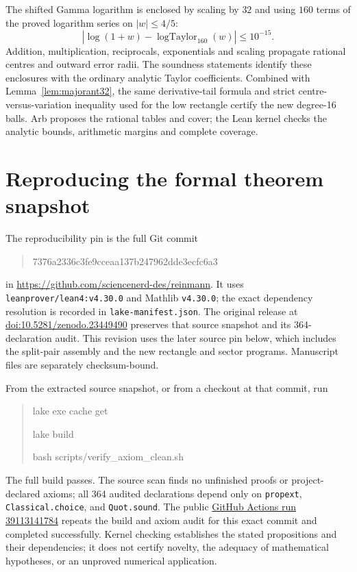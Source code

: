 \documentclass[11pt]{amsart}
\begin{document}
The shifted Gamma logarithm is enclosed by scaling by $32$ and using
$160$ terms of the proved logarithm series on $|w|\le4/5$:
\[
 |\log(1+w)-\operatorname{logTaylor}_{160}(w)|\le10^{-15}.
\]
Addition, multiplication, reciprocals, exponentials and scaling propagate
rational centres and outward error radii. The soundness statements identify
these enclosures with the ordinary analytic Taylor coefficients. Combined
with Lemma~\ref{lem:majorant32}, the same derivative-tail formula and strict
centre-versus-variation inequality used for the low rectangle certify the
new degree-16 balls. Arb proposes the rational tables and cover; the Lean
kernel checks the analytic bounds, arithmetic margins and complete coverage.

\appendix
\section{Reproducing the formal theorem snapshot}\label{app:repro}
The reproducibility pin is the full Git commit
\begin{quote}\small\ttfamily
7376a2336c3fe9cceaa137b247962dde3ecfc6a3
\end{quote}
in \url{https://github.com/sciencenerd-des/reinmann}. It uses
\texttt{leanprover/lean4:v4.30.0} and Mathlib \texttt{v4.30.0}; the exact dependency
resolution is recorded in \texttt{lake-manifest.json}. The original release at
\href{https://doi.org/10.5281/zenodo.23449490}{doi:10.5281/zenodo.23449490}
preserves that source snapshot and its 364-declaration audit. This revision uses
the later source pin below, which includes the split-pair assembly and the new
rectangle and sector programs. Manuscript files are separately checksum-bound.

From the extracted source snapshot, or from a checkout at that commit, run
\begin{quote}\small\ttfamily\raggedright
lake exe cache get\par
lake build\par
bash scripts/verify\_axiom\_clean.sh
\end{quote}
The full build passes. The source scan finds no unfinished proofs or project-declared
axioms; all 364 audited declarations depend only on \texttt{propext},
\texttt{Classical.choice}, and \texttt{Quot.sound}. The public
\href{https://github.com/sciencenerd-des/reinmann/actions/runs/39113141784}{GitHub Actions run 39113141784}
repeats the build and axiom audit for this exact commit and completed successfully.
Kernel checking establishes the stated propositions and their dependencies; it
does not certify novelty, the adequacy of mathematical hypotheses, or an unproved
numerical application.
\end{document}
